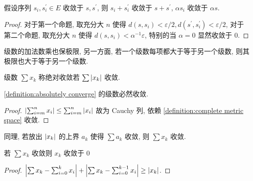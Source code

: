 \begin{lemma}
    假设序列 \(s_i,s_i^\prime \in E\) 收敛于 \(s,s^\prime\), 则 \(s_i + s_i^\prime\) 收敛于 \(s + s^\prime\),
    \(\alpha s_i\) 收敛于 \(\alpha s\).

    \begin{proof}
        对于第一个命题, 取充分大 \(n\) 使得 \(d(s,s_i) < \varepsilon/2,d(s^\prime,s_i^\prime) < \varepsilon/2\),
        对于第二个命题, 取充分大 \(n\) 使得 \(d(s,s_i) < \alpha^{-1} \varepsilon\), 特别的当 \(\alpha = 0\) 显然收敛于 \(0\).
    \end{proof}
\end{lemma}

\begin{remark}
    级数的加法数乘也保极限, 另一方面, 若一个级数每项都大于等于另一个级数, 则其极限也大于等于另一个级数.
\end{remark}

\begin{definition}[绝对收敛]
    \label {definition:absolutely converge}
    级数 \(\sum x_k\) 称绝对收敛若 \(\sum \abs{x_k}\) 收敛.
\end{definition}

\begin{lemma}
    \ref{definition:absolutely converge} 的级数必然收敛.

    \begin{proof}
        \(\abs {\sum_{i=m}^{n} x_i} \leq \sum_{i=m}^{n} \abs{x_i}\) 故为 Cauchy 列, 依赖 \ref{definition:complete metric space} 收敛.
    \end{proof}
\end{lemma}

\begin{corollary}
    \label {corollary:upper bound converge then converge}
    同理, 若放出 \(\abs{x_k}\) 的上界 \(a_k\) 使得 \(\sum a_k\) 收敛, 则 \(\sum x_k\) 收敛.
\end{corollary}

\begin{lemma}
    若 \(\sum x_k\) 收敛则 \(x_k\) 收敛于 \(0\)

    \begin{proof}
        \(\abs {\sum x_k - \sum_{i=0}^{k} x_i} + \abs {\sum x_k - \sum_{i=0}^{k-1} x_i} \geq \abs {x_k}\).
    \end{proof}
\end{lemma}

